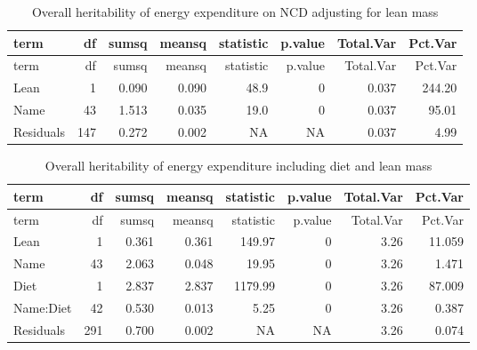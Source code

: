 \documentclass[]{article}
\newenvironment{Shaded}{\begin{snugshade}}{\end{snugshade}}
\newcommand{\DataTypeTok}[1]{\textcolor[rgb]{0.13,0.29,0.53}{#1}}
\newcommand{\DecValTok}[1]{\textcolor[rgb]{0.00,0.00,0.81}{#1}}
\newcommand{\KeywordTok}[1]{\textcolor[rgb]{0.13,0.29,0.53}{\textbf{#1}}}
\newcommand{\NormalTok}[1]{#1}
\newcommand{\OperatorTok}[1]{\textcolor[rgb]{0.81,0.36,0.00}{\textbf{#1}}}
\newcommand{\StringTok}[1]{\textcolor[rgb]{0.31,0.60,0.02}{#1}}
\begin{document}
\begin{longtable}[]{@{}lrrrrrrr@{}}
\caption{Overall heritability of energy expenditure on NCD adjusting for
lean mass}\tabularnewline
\toprule
term & df & sumsq & meansq & statistic & p.value & Total.Var &
Pct.Var\tabularnewline
\midrule
\endfirsthead
\toprule
term & df & sumsq & meansq & statistic & p.value & Total.Var &
Pct.Var\tabularnewline
\midrule
\endhead
Lean & 1 & 0.090 & 0.090 & 48.9 & 0 & 0.037 & 244.20\tabularnewline
Name & 43 & 1.513 & 0.035 & 19.0 & 0 & 0.037 & 95.01\tabularnewline
Residuals & 147 & 0.272 & 0.002 & NA & NA & 0.037 & 4.99\tabularnewline
\bottomrule
\end{longtable}

\begin{Shaded}
\end{Shaded}

\begin{longtable}[]{@{}lrrrrrrr@{}}
\caption{Overall heritability of energy expenditure including diet and
lean mass}\tabularnewline
\toprule
term & df & sumsq & meansq & statistic & p.value & Total.Var &
Pct.Var\tabularnewline
\midrule
\endfirsthead
\toprule
term & df & sumsq & meansq & statistic & p.value & Total.Var &
Pct.Var\tabularnewline
\midrule
\endhead
Lean & 1 & 0.361 & 0.361 & 149.97 & 0 & 3.26 & 11.059\tabularnewline
Name & 43 & 2.063 & 0.048 & 19.95 & 0 & 3.26 & 1.471\tabularnewline
Diet & 1 & 2.837 & 2.837 & 1179.99 & 0 & 3.26 & 87.009\tabularnewline
Name:Diet & 42 & 0.530 & 0.013 & 5.25 & 0 & 3.26 & 0.387\tabularnewline
Residuals & 291 & 0.700 & 0.002 & NA & NA & 3.26 & 0.074\tabularnewline
\bottomrule
\end{longtable}
\end{document}
